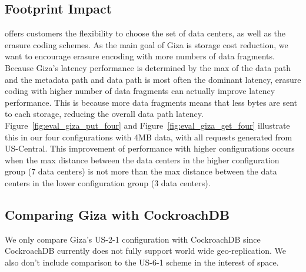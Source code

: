 
\subsection{Footprint Impact}



\name offers customers the flexibility to choose the set of data centers, as well as the erasure coding schemes. As the main goal of Giza is storage cost reduction, we want to encourage erasure encoding with more numbers of data fragments. Because Giza’s latency performance is determined by the max of the data path and the metadata path and data path is most often the dominant latency, erasure coding with higher number of data fragments can actually improve latency performance. This is because more data fragments means that less bytes are sent to each storage, reducing the overall data path latency. Figure~\ref{fig:eval_giza_put_four} and  Figure~\ref{fig:eval_giza_get_four} illustrate this in our four configurations with 4MB data, with all requests generated from US-Central. This improvement of performance with higher configurations occurs when the max distance between the data centers in the higher configuration group (7 data centers) is not more than the max distance between the data centers in the lower configuration group (3 data centers).


\subsection{Comparing Giza with CockroachDB}
We only compare Giza's US-2-1 configuration with CockroachDB since CockroachDB currently does not fully support world wide geo-replication. We also don't include comparison to  the US-6-1 scheme in the interest of space.

